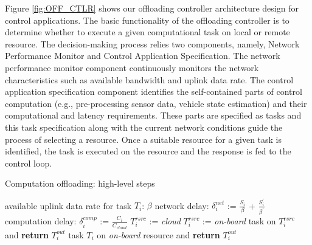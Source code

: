 Figure \ref{fig:OFF_CTLR} shows our offloading controller architecture design for control applications. The basic functionality of the offloading controller is to determine whether to execute a given computational task on local or remote resource. The decision-making process relies two components, namely, Network Performance Monitor and Control Application Specification. The network performance monitor component continuously monitors the network characteristics such as available bandwidth and uplink data rate. The control application specification component identifies the self-contained parts of control computation (e.g., pre-processing sensor data, vehicle state estimation) and their computational and latency requirements. These parts are specified as tasks and this task specification along with the current network conditions guide the process of selecting a resource. Once a suitable resource for a given task is identified, the task is executed on the resource and the response is fed to the control loop. 

\begin{algorithm}
\;
\;

\caption{Computation offloading: high-level steps}
\label{alg:off_ctlr}
\;
\begin{algorithmic}
 available uplink data rate for task $T_{i}$: $\beta$
 network delay: $\delta_{i}^{net}$ := $\frac{S_{i}}{\beta}$ + $\frac{S_{i}^{\prime}}{\beta^{\prime}}$
 computation delay: $\delta_{i}^{comp}$  := $\frac{C_{i}}{C_{cloud}}$  \;
\STATE $T_{i}^{rsrc}$ := {\em cloud} 
\ELSE
\STATE $T_{i}^{rsrc}$ := {\em on-board} 
\ENDIF
{} task on $T_{i}^{rsrc}$ and \textbf{return} $T_{i}^{out}$
 task $T_{i}$ on {\em on-board} resource and \textbf{return} $T_{i}^{out}$
\ENDIF 
\ENDWHILE
\end{algorithmic}
\end{algorithm}

